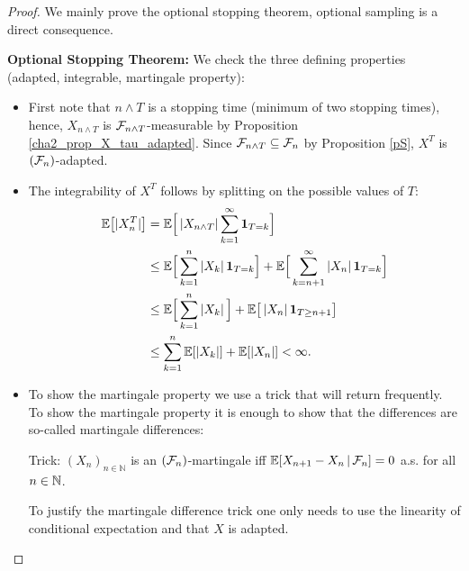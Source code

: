 \begin{proof}[Proof]
	We mainly prove the optional stopping theorem, optional sampling is a direct consequence.\smallskip
	
	\textbf{Optional Stopping Theorem:} 
			We check the three defining properties (adapted, integrable, martingale property):
			\begin{itemize}\label{(i)}
				\item 
					First note that $n\wedge T$ is a stopping time (minimum of two stopping times), hence, $X_{n\wedge T}$ is $\mathcal{F}_{n \wedge T}$-measurable by Proposition \ref{cha2_prop_X_tau_adapted}. Since $\mathcal{F}_{n\wedge T} \subseteq \mathcal{F}_n$ by Proposition \ref{pS}, $X^T$ is $(\mathcal{F}_n)$-adapted.
				\item The integrability of $X^T$ follows by splitting on the possible values of $T$:
				\begin{align*}
						\mathbb{E}\big[| X_n^T |\big] &= \mathbb{E} \Big[ \left| X_{n \wedge T} \right|  \sum\limits_{k=1}^{\infty}\mathbf 1_{T=k} \Big]\\
						&\leq \mathbb{E} \Big[\sum\limits_{k=1}^{n} \left| X_{k} \right|  \mathbf 1_{T=k} \Big]+\mathbb{E} \Big[\sum\limits_{k={n+1}}^{\infty } \left| X_{n} \right|  \mathbf 1_{T=k} \Big]\\				
						&\leq \mathbb{E} \Big[\sum\limits_{k=1}^{n} \left| X_{k} \right| \Big]+\mathbb{E} \big[\left| X_{n} \right| \mathbf 1_{T\geq n+1}\big]\\				
						&\leq \sum\limits_{k=1}^{n} \mathbb{E} [| X_{k} | ]+\mathbb{E} [\left| X_{n} \right| ]<\infty.
				\end{align*}					
				\item To show the martingale property we use a trick that will return frequently. To show the martingale property it is enough to show that the differences are so-called martingale differences:
				\begin{ltippwichtig}
					Trick: $(X_n)_{n\in\mathbb{N}}$ is an $(\mathcal{F}_n)$-martingale iff $\mathbb{E}[X_{n+1}-X_n\,|\,\mathcal{F}_n]=0$ a.s. for all $n\in\mathbb{N}$. 
				\end{ltippwichtig}
				To justify the martingale difference trick one only needs to use the linearity of conditional expectation and that $X$ is adapted.\smallskip
				

\end{itemize}
\end{proof}

